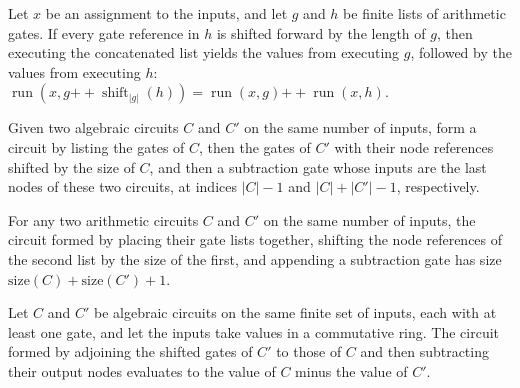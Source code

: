 \begin{theorem}
\label{Randomized.AlgCircuit.run_append_shift}
\leanok
{}
Let $x$ be an assignment to the inputs, and let $g$ and $h$ be finite lists of
arithmetic gates. If every gate reference in $h$ is shifted forward by the length of
$g$, then executing the concatenated list yields the values from executing $g$, followed
by the values from executing $h$: $\operatorname{run}(x,g\mathbin{+\!\!+}
\operatorname{shift}_{|g|}(h))=\operatorname{run}(x,g)\mathbin{+\!\!+}\operatorname{run}(x,h)$.
\end{theorem}

\begin{definition}
\label{Randomized.AlgCircuit.subCircuit}
\leanok
{}
Given two algebraic circuits $C$ and $C'$ on the same number of inputs, form a circuit
by listing the gates of $C$, then the gates of $C'$ with their node references shifted
by the size of $C$, and then a subtraction gate whose inputs are the last nodes of these
two circuits, at indices $|C|-1$ and $|C|+|C'|-1$, respectively.
\end{definition}

\begin{theorem}
\label{Randomized.AlgCircuit.size_subCircuit}
\leanok
{}
For any two arithmetic circuits $C$ and $C'$ on the same number of inputs, the circuit
formed by placing their gate lists together, shifting the node references of the second
list by the size of the first, and appending a subtraction gate has size
$\mathrm{size}(C)+\mathrm{size}(C')+1$.
\end{theorem}

\begin{theorem}
\label{Randomized.AlgCircuit.eval_subCircuit}
\leanok
{}
Let $C$ and $C'$ be algebraic circuits on the same finite set of inputs, each with at
least one gate, and let the inputs take values in a commutative ring. The circuit formed
by adjoining the shifted gates of $C'$ to those of $C$ and then subtracting their output
nodes evaluates to the value of $C$ minus the value of $C'$.
\end{theorem}

